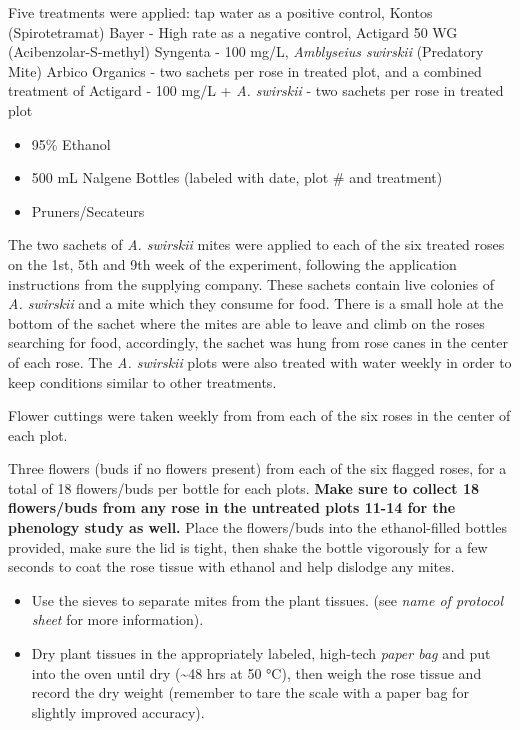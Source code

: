 \documentclass[12pt,final,CPage]{ufthesis}
\begin{document}
{  Five treatments were applied: tap water as a positive control, Kontos (Spirotetramat) Bayer - High rate as a negative control, Actigard 50 WG (Acibenzolar-S-methyl) Syngenta - 100 \si{\milli\gram}/\si{\liter}, \emph{Amblyseius swirskii} (Predatory Mite) Arbico Organics - two sachets per rose in treated plot, and a combined treatment of Actigard - 100 \si{\milli\gram}/\si{\liter} + \emph{A. swirskii} - two sachets per rose in treated plot
  \begin{itemize}
  \tightlist
  \item
    95\% Ethanol
  \item
    500 mL Nalgene Bottles (labeled with date, plot \# and treatment)
  \item
    Pruners/Secateurs
  \end{itemize}
  The two sachets of \emph{A. swirskii} mites were applied to each of the six treated roses on the 1st, 5th and 9th week of the experiment, following the application instructions from the supplying company. These sachets contain live colonies of \emph{A. swirskii} and a mite which they consume for food. There is a small hole at the bottom of the sachet where the mites are able to leave and climb on the roses searching for food, accordingly, the sachet was hung from rose canes in the center of each rose. The \emph{A. swirskii} plots were also treated with water weekly in order to keep conditions similar to other treatments.

  Flower cuttings were taken weekly from from each of the six roses in the center of each plot.

  Three flowers (buds if no flowers present) from each of the six flagged roses, for a total of 18 flowers/buds per bottle for each plots. \textbf{Make sure to collect 18 flowers/buds from any rose in the untreated plots 11-14 for the phenology study as well.} Place the flowers/buds into the ethanol-filled bottles provided, make sure the lid is tight, then shake the bottle vigorously for a few seconds to coat the rose tissue with ethanol and help dislodge any mites.
  \begin{itemize}
  \item
    Use the sieves to separate mites from the plant tissues. (see \emph{name of protocol sheet} for more information).
  \item
    Dry plant tissues in the appropriately labeled, high-tech \emph{paper bag} and put into the oven until dry (\textasciitilde48 hrs at 50 °C), then weigh the rose tissue and record the dry weight (remember to tare the scale with a paper bag for slightly improved accuracy).
  \end{itemize}
  \hypertarget{jenna-beef}{%
}}
\end{document}
